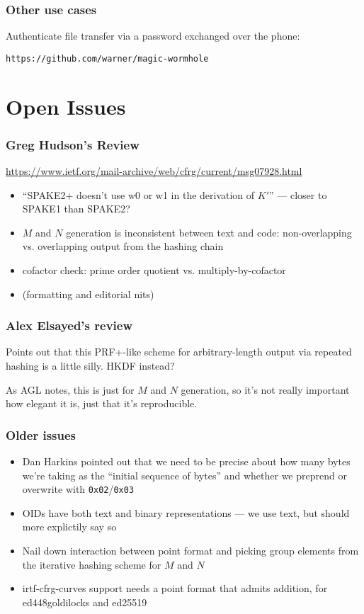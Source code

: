 \documentclass{beamer}
\begin{document}
\begin{frame}[fragile]
\frametitle{Other use cases}
Authenticate file transfer via a password exchanged over the phone:

\verb+https://github.com/warner/magic-wormhole+
\end{frame}

\section{Open Issues}

\begin{frame}[fragile]
\frametitle{Greg Hudson's Review}
\url{https://www.ietf.org/mail-archive/web/cfrg/current/msg07928.html}

\begin{itemize}
\item{``SPAKE2+ doesn't use w0 or w1 in the derivation of $K'$'' --- closer to SPAKE1
than SPAKE2?}
\item{$M$ and $N$ generation is inconsistent between text and code:
non-overlapping vs. overlapping output from the hashing chain}
\item{cofactor check: prime order quotient vs. multiply-by-cofactor}
\item{(formatting and editorial nits)}
\end{itemize}
\end{frame}

\begin{frame}[fragile]
\frametitle{Alex Elsayed's review}
Points out that this PRF+-like scheme for arbitrary-length output via
repeated hashing is a little silly. HKDF instead?

As AGL notes, this is just for $M$ and $N$ generation, so it's not
really important how elegant it is, just that it's reproducible.
\end{frame}

\begin{frame}[fragile]
\frametitle{Older issues}
\begin{itemize}
\item{Dan Harkins pointed out that we need to be precise about how many
bytes we're taking as the ``initial sequence of bytes'' and whether
we preprend or overwrite with \verb+0x02+/\verb+0x03+}
\item{OIDs have both text and binary representations --- we use text, but should
more explictily say so}
\item{Nail down interaction between point format and picking group elements
from the iterative hashing scheme for $M$ and $N$}
\item{irtf-cfrg-curves support needs a point format that admits addition,
for ed448goldilocks and ed25519}
\end{itemize}
\end{frame}
\end{document}
